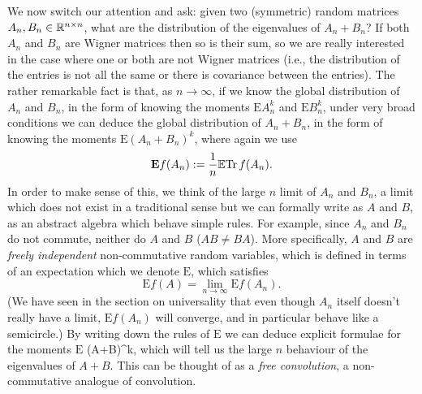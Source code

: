 We now switch our attention and ask: given two (symmetric) random matrices $A_n, B_n \in {\mathbb R}^{n \times n}$, what are the distribution of the eigenvalues of $A_n+B_n$? If both $A_n$ and $B_n$ are Wigner matrices then so is their sum, so we are really interested in the case where one or both are not Wigner matrices (i.e., the distribution of the entries is not all the same or there is covariance between the entries).  The rather remarkable fact is that, as $n \ensuremath{\rightarrow} \ensuremath{\infty}$,  if we know the global distribution of $A_n$ and $B_n$, in the form of knowing the moments $\ensuremath{\bm{\mathrm{E}}} A_n^k$ and $\ensuremath{\bm{\mathrm{E}}} B_n^k$, under very broad conditions we can deduce the global distribution of $A_n+B_n$, in the form of knowing the moments $\ensuremath{\bm{\mathrm{E}}} (A_n+B_n)^k$, where again we use
\[
\bm{\mathrm{E}} f(A_n) := {1 \over n} {\mathbb E} {\rm Tr}\, f(A_n).
\]
In order to make sense of this, we think of the large $n$ limit of $A_n$ and $B_n$, a limit which does not exist in a traditional sense but we can formally write as $A$ and $B$, as an abstract algebra which behave simple rules.  For example, since $A_n$ and $B_n$ do not commute, neither do $A$ and $B$ ($AB \ensuremath{\neq} BA$). More specifically, $A$ and $B$ are  \emph{freely independent} non-commutative random variables, which is defined in terms of an expectation which we denote $\ensuremath{\bm{\mathrm{E}}}$, which satisfies
\[
    \ensuremath{\bm{\mathrm{E}}} f(A) = \lim_{n \ensuremath{\rightarrow} \ensuremath{\infty}} \ensuremath{\bm{\mathrm{E}}} f(A_n).
\]
(We have seen in the section on universality that even though $A_n$ itself doesn't really have a limit, $\ensuremath{\bm{\mathrm{E}}} f(A_n)$ will converge, and in particular behave like a semicircle.) By writing down the rules of $\ensuremath{\bm{\mathrm{E}}}$ we can deduce explicit formulae for the moments \ensuremath{\bm{\mathrm{E}}} (A+B)\^{}k, which will tell us the large $n$ behaviour of the eigenvalues of $A+B$. This can be thought of as a \emph{free convolution}, a non-commutative analogue of convolution. 

